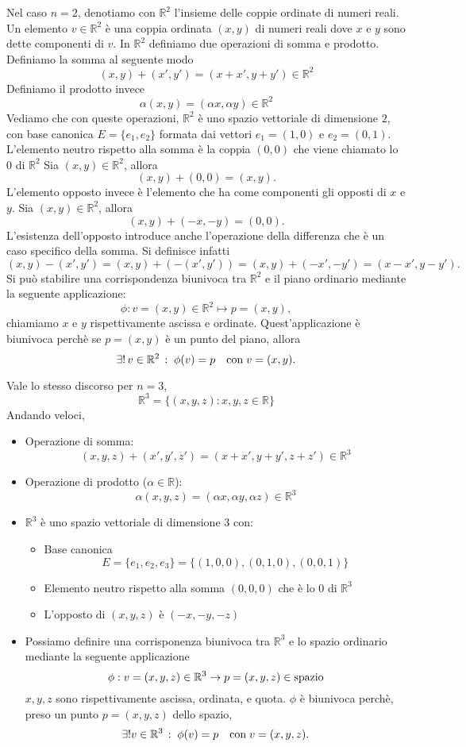 \documentclass{article}
\theoremstyle{plain}
\theoremstyle{definition}
\theoremstyle{remark}
\begin{document}
Nel caso $n=2$, denotiamo con $\mathbb{R}^2$ l'insieme delle coppie ordinate di numeri reali.
Un elemento $v\in\mathbb{R}^2$ è una coppia ordinata $(x,y)$ di numeri reali dove $x$ e $y$ sono dette componenti di $v$.
In $\mathbb{R}^2$ definiamo due operazioni di somma e prodotto.
Definiamo la somma al seguente modo 
\[(x,y)+(x',y')=(x+x',y+y')\in\mathbb{R}^2\]
Definiamo il prodotto invece 
\[\alpha(x,y)=(\alpha x, \alpha y)\in\mathbb{R}^2\]
Vediamo che con queste operazioni, $\mathbb{R}^2$ è uno spazio vettoriale di dimensione $2$, con base canonica $E=\{e_1,e_2\}$
formata dai vettori $e_1=(1,0)$ e $e_2=(0,1)$. 
L'elemento neutro rispetto alla somma è la coppia $(0,0)$ che viene chiamato lo $0$ di $\mathbb{R}^2$
Sia $(x,y)\in\mathbb{R}^2$, allora \[(x,y)+(0,0)=(x,y).\]
L'elemento opposto invece è l'elemento che ha come componenti gli opposti di $x$ e $y$.
Sia $(x,y)\in\mathbb{R}^2$, allora \[(x,y)+(-x,-y)=(0,0).\]
L'esistenza dell'opposto introduce anche l'operazione della differenza che è un caso specifico della somma. 
Si definisce infatti 
\[(x,y)-(x',y')=(x,y)+(-(x',y'))=(x,y)+(-x',-y')=(x-x',y-y').\]
Si può stabilire una corrispondenza biunivoca tra $\mathbb{R}^2$ e il piano ordinario mediante la seguente applicazione:
\[\phi: v=(x,y)\in\mathbb{R}^2\mapsto p=(x,y),\] chiamiamo $x$ e $y$ rispettivamente ascissa e ordinate.
Quest'applicazione è biunivoca perchè se $p=(x,y)$ è un punto del piano, allora 
\[\exists!\,v\in\mathbb{R}^2\,:\;\phi(v)=p\quad\textup{con}\;v=(x,y).\]

\vspace{10pt}

Vale lo stesso discorso per $n=3$,
\[\mathbb{R}^3=\{(x,y,z): x,y,z\in\mathbb{R}\}\]
Andando veloci,
\begin{itemize}
    \item Operazione di somma:
    \[(x,y,z)+(x',y',z')=(x+x',y+y',z+z')\in\mathbb{R}^3\]
    \item Operazione di prodotto ($\alpha\in\mathbb{R}$):
    \[\alpha(x,y,z)=(\alpha x,\alpha y, \alpha z)\in\mathbb{R}^3\]
    \item $\mathbb{R}^3$ è uno spazio vettoriale di dimensione $3$ con:
    \begin{itemize}
        \item Base canonica \[E=\{e_1,e_2,e_3\}=\{(1,0,0),(0,1,0),(0,0,1)\}\]
        \item Elemento neutro rispetto alla somma $(0,0,0)$ che è lo $0$ di $\mathbb{R}^3$
        \item L'opposto di $(x,y,z)$ è $(-x,-y,-z)$
    \end{itemize}
    \item Possiamo definire una corrisponenza biunivoca tra $\mathbb{R}^3$ e lo spazio ordinario mediante la seguente applicazione
    \[\phi:v=(x,y,z)\in\mathbb{R}^3\to p=(x,y,z)\in \textup{spazio}\]
    $x,y,z$ sono rispettivamente ascissa, ordinata, e quota.
    $\phi$ è biunivoca perchè, preso un punto $p=(x,y,z)$ dello spazio, \[\exists!v\in\mathbb{R}^3\,:\;\phi(v)=p\quad\textup{con}\;v=(x,y,z).\]
\end{itemize}
\end{document}
